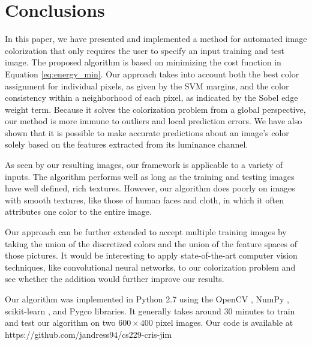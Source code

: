 \section{Conclusions}
\label{sec:conclusions}

In this paper, we have presented and implemented a method for automated image colorization that only requires the user to specify an input training and test image. The proposed algorithm is based on minimizing the cost function in Equation \ref{eq:energy_min}. Our approach takes into account both the best color assignment for individual pixels, as given by the SVM margins, and the color consistency within a neighborhood of each pixel, as indicated by the Sobel edge weight term. Because it solves the colorization problem from a global perspective, our method is more immune to outliers and local prediction errors. We have also shown that it is possible to make accurate predictions about an image's color solely based on the features extracted from its luminance channel. 

As seen by our resulting images, our framework is applicable to a variety of inputs. The algorithm performs well as long as the training and testing images have well defined, rich textures. However, our algorithm does poorly on images with smooth textures, like those of human faces and cloth, in which it often attributes one color to the entire image. 

Our approach can be further extended to accept multiple training images by taking the union of the discretized colors and the union of the feature spaces of those pictures.  It would be interesting to apply state-of-the-art computer vision techniques, like convolutional neural networks, to our colorization problem and see whether the addition would further improve our results.

Our algorithm was implemented in Python 2.7 using the OpenCV \cite{opencv_library}, NumPy \cite{jones_scipy}, scikit-learn \cite{scikit-learn}, and Pygco \cite{mueller_pygco} libraries.  It generally takes around 30 minutes to train and test our algorithm on two $600 \times 400$ pixel images.  Our code is available at https://github.com/jandress94/cs229-cris-jim
